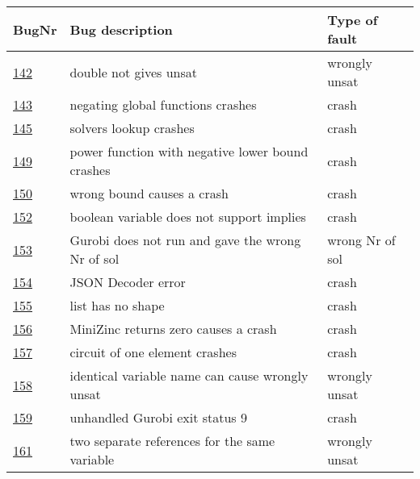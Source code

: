 \begin{table}[]
	\centering
	\begin{tabular}{lll}
		BugNr & Bug description                                           & Type of fault   \\ \toprule
		\href{https://github.com/CPMpy/cpmpy/issues/142}{142} & double not gives unsat                            & wrongly unsat   \\
		\href{https://github.com/CPMpy/cpmpy/issues/143}{143} & negating global functions crashes                 & crash           \\
		\href{https://github.com/CPMpy/cpmpy/issues/145}{145} & solvers lookup crashes                            & crash           \\
		\href{https://github.com/CPMpy/cpmpy/issues/149}{149} & power function with negative lower bound crashes  & crash           \\
		\href{https://github.com/CPMpy/cpmpy/issues/150}{150} & wrong bound causes a crash                  & crash           \\
		\href{https://github.com/CPMpy/cpmpy/issues/152}{152} & boolean variable does not support implies         & crash           \\
		\href{https://github.com/CPMpy/cpmpy/issues/153}{153} & Gurobi does not run and gave the wrong Nr of sol  & wrong Nr of sol \\
		\href{https://github.com/CPMpy/cpmpy/issues/154}{154} & JSON Decoder error                                & crash           \\
		\href{https://github.com/CPMpy/cpmpy/issues/155}{155} & list has no shape                                 & crash           \\
		\href{https://github.com/CPMpy/cpmpy/issues/156}{156} & MiniZinc returns zero causes a crash              & crash           \\
		\href{https://github.com/CPMpy/cpmpy/issues/157}{157} & circuit of one element crashes                    & crash           \\
		\href{https://github.com/CPMpy/cpmpy/issues/158}{158} & identical variable name can cause wrongly unsat   & wrongly unsat   \\
		\href{https://github.com/CPMpy/cpmpy/issues/159}{159} & unhandled Gurobi exit status 9                    & crash           \\
		\href{https://github.com/CPMpy/cpmpy/issues/161}{161} & two separate references for the same variable     & wrongly unsat   \\

\end{tabular}
\end{table}
